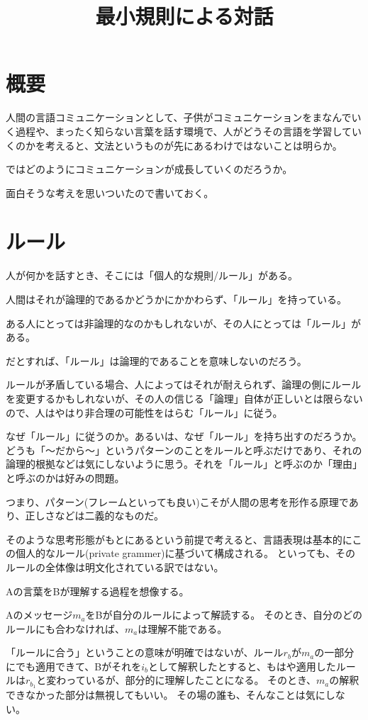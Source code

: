 \documentclass[10pt, oneside]{jarticle}   	%
\title{最小規則による対話}
\author{\myname}
\begin{document}
\maketitle

\section{概要}
人間の言語コミュニケーションとして、子供がコミュニケーションをまなんでいく過程や、まったく知らない言葉を話す環境で、人がどうその言語を学習していくのかを考えると、文法というものが先にあるわけではないことは明らか。

ではどのようにコミュニケーションが成長していくのだろうか。

面白そうな考えを思いついたので書いておく。

\section{ルール}
人が何かを話すとき、そこには「個人的な規則/ルール」がある。

人間はそれが論理的であるかどうかにかかわらず、「ルール」を持っている。

ある人にとっては非論理的なのかもしれないが、その人にとっては「ルール」がある。

だとすれば、「ルール」は論理的であることを意味しないのだろう。

ルールが矛盾している場合、人によってはそれが耐えられず、論理の側にルールを変更するかもしれないが、その人の信じる「論理」自体が正しいとは限らないので、人はやはり非合理の可能性をはらむ「ルール」に従う。

なぜ「ルール」に従うのか。あるいは、なぜ「ルール」を持ち出すのだろうか。
どうも「〜だから〜」というパターンのことをルールと呼ぶだけであり、それの論理的根拠などは気にしないように思う。それを「ルール」と呼ぶのか「理由」と呼ぶのかは好みの問題。

つまり、パターン(フレームといっても良い)こそが人間の思考を形作る原理であり、正しさなどは二義的なものだ。

そのような思考形態がもとにあるという前提で考えると、言語表現は基本的にこの個人的なルール(private grammer)に基づいて構成される。
といっても、そのルールの全体像は明文化されている訳ではない。

Aの言葉をBが理解する過程を想像する。

Aのメッセージ$m_a$をBが自分のルールによって解読する。
そのとき、自分のどのルールにも合わなければ、$m_a$は理解不能である。

「ルールに合う」ということの意味が明確ではないが、ルール$r_b$が$m_a$の一部分にでも適用できて、Bがそれを$i_b$として解釈したとすると、もはや適用したルールは$r_{b_1}$と変わっているが、部分的に理解したことになる。
そのとき、$m_a$の解釈できなかった部分は無視してもいい。
その場の誰も、そんなことは気にしない。
\end{document}

